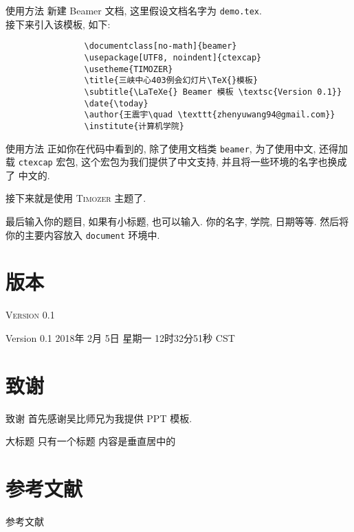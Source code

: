 \documentclass[no-math]{beamer}
\begin{document}
        \begin{frame}[fragile]{使用方法}
            新建 Beamer 文档, 这里假设文档名字为 \texttt{demo.tex}.\\
            接下来引入该模板, 如下:
            \begin{verbatim}
                \documentclass[no-math]{beamer}
                \usepackage[UTF8, noindent]{ctexcap}
                \usetheme{TIMOZER}
                \title{三峡中心403例会幻灯片\TeX{}模板}
                \subtitle{\LaTeXe{} Beamer 模板 \textsc{Version 0.1}}
                \date{\today}
                \author{王震宇\quad \texttt{zhenyuwang94@gmail.com}}
                \institute{计算机学院}
            \end{verbatim}
        \end{frame}
        \begin{frame}{使用方法}
            正如你在代码中看到的, 除了使用文档类 \texttt{beamer}, 为了使用中文, 还得加载
            \texttt{ctexcap} 宏包, 这个宏包为我们提供了中文支持, 并且将一些环境的名字也换成了
            中文的.

            接下来就是使用 \textsc{Timozer} 主题了.

            最后输入你的题目, 如果有小标题, 也可以输入. 你的名字, 学院, 日期等等.
            然后将你的主要内容放入 \texttt{document} 环境中.
        
        \end{frame}

    \section{版本}
        \begin{frame}{\textsc{Version 0.1}}
            \begin{block}{Version 0.1}
                2018年 2月 5日 星期一 12时32分51秒 CST
            \end{block}
        \end{frame}

    \section{致谢}
        \begin{frame}{致谢}
            首先感谢吴比师兄为我提供 PPT 模板.
        \end{frame}
    \begin{frame}{大标题}
        只有一个标题
        内容是垂直居中的 \cite{Teney_2017_CVPR}
    \end{frame}

    \section{参考文献}
    \begin{frame}{参考文献}
        
        
    \end{frame}
\end{document}

